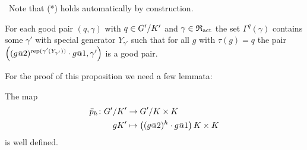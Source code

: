 \documentclass[a4paper,11pt]{amsart}
\newcommand\replace[2]{\st{#1}{\color{Green4}\ #2}}
\begin{document}
\replace{}{Note that (*) holds automatically by construction.}
 \begin{pro}\label{pro:existsNextPair}
 For each good pair $(q,\gamma)$ with $q\in{G'/K'}$ and $\gamma\in\mathfrak{R}_{\operatorname{act}}$ the set $\Gamma^q(\gamma)$ 
 contains some $\gamma'$ with special generator $Y_{\gamma'}$ such that for all $g$ with $\tau(g)=q$ the
 pair $\left((g\at{2})^{\rep(\gamma'(Y_{\gamma'}))}\cdot g\at{1},\gamma'\right)$ is a good pair.
\end{pro}
For the proof of this proposition we need a few lemmata:
%
%  
\begin{lem} \label{lem:pIsDefinedModK'}
 The map 
 \begin{align*} 
  \bar p_h\colon \RNK{G'}{K'} &\to \RNK{G'}{K\times K}\\
  gK'&\mapsto \left((g\at{2})^h\cdot g\at{1}\right){K\times K}
 \end{align*}
is well defined.
\end{lem}
\end{document}
